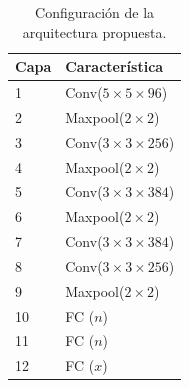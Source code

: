 \begin{table}[h]
	\centering
	\begin{tabular}{m{1cm} m{3cm}  }
		\toprule
		\textbf{Capa} & \textbf{Característica}\\
		\midrule
		1 & Conv($5\times 5 \times 96$)\\
		2 & Maxpool($2\times 2$)\\
		3 & Conv($3\times 3 \times 256$)\\
		4 & Maxpool($2\times 2$)\\
		5 & Conv($3\times 3 \times 384$)\\
		6 & Maxpool($2\times 2$)\\
		7 & Conv($3\times 3 \times 384$)\\
		8 & Conv($3\times 3 \times 256$)\\
		9 & Maxpool($2\times 2$)\\
		10 & FC ($n$)\\
		11 & FC ($n$)\\
		12 & FC ($x$)\\
		\bottomrule
		\hline
	\end{tabular}
	\caption{Configuración de la arquitectura propuesta.}
	\label{tab:Table11}
\end{table}

